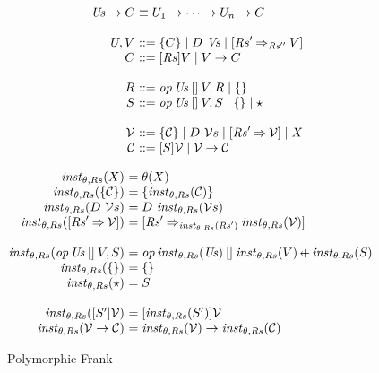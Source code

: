 \documentclass[preprint]{sigplanconf}
\begin{document}
\begin{figure*}[p]
\newcommand{\Rs}{\mathit{Rs}}
\renewcommand{\instts}[1]{\inst{\theta}{Rs}{#1}}

\[
\begin{array}{@{}r@{~}l@{}}
\Us \to \C &\equiv \U_1 \to \dots \to \U_n \to \C \\
\\
\U, \V &::= \thunk{\C} \mid \D~\Vs \mid \handleType{\Rs'}{\Rs''}{\V} \\
\C     &::= \ret{\Rs}{\V} \mid \V \to \C \\
\\
R &::= \template{\op\,\Us}{}{\V}, R \mid \nothing \\
\sig &::= \template{\op\,\Us}{}{\V}, \sig \mid \nothing \mid \star \\
\\
\VV &::= \thunk{\CC} \mid \D~\VVs \mid \handleTypePoly{\Rs'}{\VV} \mid \X \\
\CC &::= \ret{\sigs}{\VV} \mid \VV \to \CC \\
\end{array}
\]

\[
\begin{array}{@{}r@{~}l@{\quad}l@{}}
\instts{\X}      &= \theta(\X) \\
\instts{\thunk{\CC}} &= \thunk{\instts{\CC}} \\
\instts{\D~\VVs}     &= \D~\instts{\VVs} \\
\instts{\handleTypePoly{\Rs'}{\VV}} 
                     &= \handleType{\Rs'}{\instts{\Rs'}}{\instts{\VV}} \\
\\
\instts{\template{\op\,\Us}{}{\V},\sig}
                     &= \template{\op\,\instts{\Us}}{}{\instts{\V}} \lplus \instts{\sig} \\
\instts{\nothing}    &= \nothing \\
\instts{\star}       &= \sigs \\
\\
\instts{\ret{\sigs'}{\VV}} &= \ret{\instts{\sigs'}}{\VV} \\
\instts{\VV \to \CC}       &= \instts{\VV} \to \instts{\CC} \\
\end{array}
\]


\caption{Polymorphic Frank}
\end{figure*}


\end{document}

